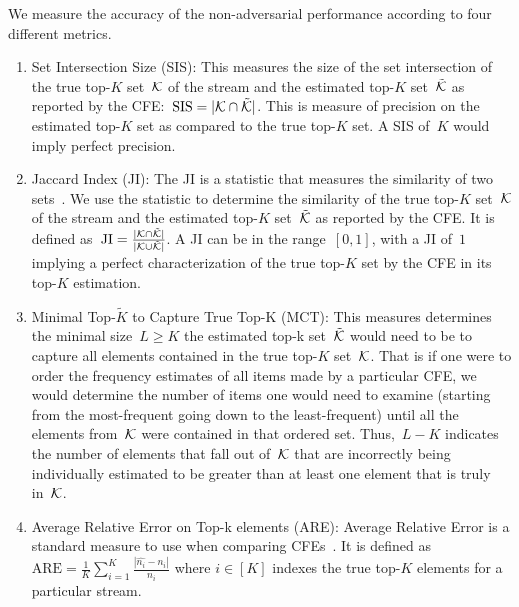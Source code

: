 We measure the accuracy of the non-adversarial performance according to four different metrics.

\begin{enumerate}
    \item Set Intersection Size (SIS): This measures the size of the set intersection of the true top-$K$ set~$\mathcal{K}$ of the stream and the estimated top-$K$ set~$\tilde{\mathcal{K}}$ as reported by the CFE:~$\text{SIS} = |\mathcal{K} \cap \tilde{\mathcal{K}}|$. This is measure of precision on the estimated top-$K$ set as compared to the true top-$K$ set. A SIS of~$K$ would imply perfect precision. 
    
    \item Jaccard Index (JI): The JI is a statistic that measures the similarity of two sets~\cite{real1996probabilistic}. We use the statistic to determine the similarity of the true top-$K$ set~$\mathcal{K}$ of the stream and the estimated top-$K$ set~$\tilde{\mathcal{K}}$ as reported by the CFE. It is defined as~$\mathrm{JI} = \frac{|\mathcal{K} \cap \tilde{\mathcal{K}}|}{|\mathcal{K} \cup \tilde{\mathcal{K}}|}$. A JI can be in the range~$[0,1]$, with a JI of~$1$ implying a perfect characterization of the true top-$K$ set by the CFE in its top-$K$ estimation. 
    
    \item Minimal Top-$\tilde{K}$ to Capture True Top-K (MCT):
    This measures determines the minimal size~$L \geq K$ the estimated top-k set~$\tilde{\mathcal{K}}$ would need to be to capture all elements contained in the true top-$K$ set~$\mathcal{K}$. That is if one were to order the frequency estimates of all items made by a particular CFE, we would determine the number of items one would need to examine (starting from the most-frequent going down to the least-frequent) until all the elements from~$\mathcal{K}$ were contained in that ordered set. Thus,~$L-K$ indicates the number of elements that fall out of~$\mathcal{K}$ that are incorrectly being individually estimated to be greater than at least one element that is truly in~$\mathcal{K}$. 
    
    \item Average Relative Error on Top-k  elements (ARE):
    Average Relative Error is a standard measure to use when comparing CFEs~\cite{yang2019heavykeeper}. It is defined as~$\mathrm{ARE} = \frac{1}{K} \sum_{i=1}^{K} \frac{| \hat{n_{i}} - n_{i}|}{n_{i}}$
    where $i \in [K]$ indexes the true top-$K$ elements for a particular stream.
\end{enumerate}

